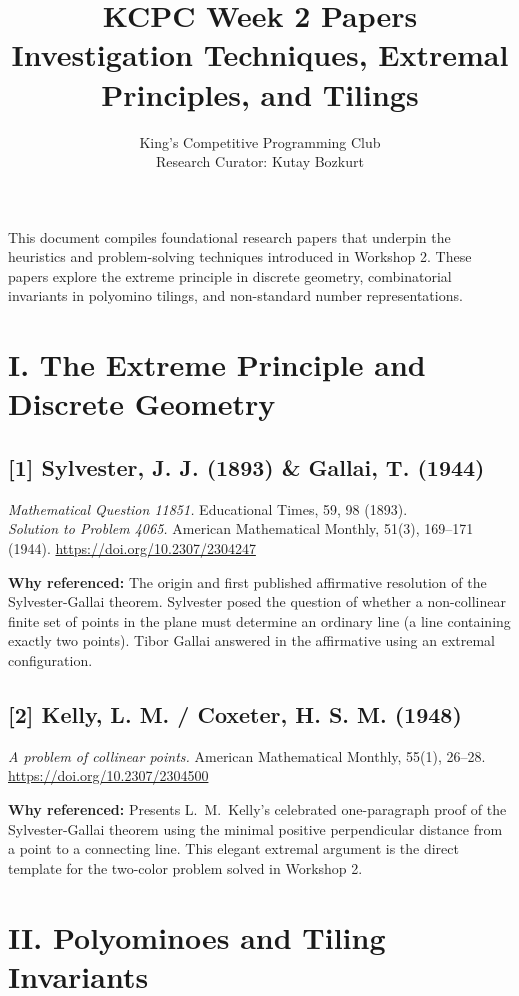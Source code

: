 \documentclass[11pt]{article}
\title{KCPC Week 2 Papers\\Investigation Techniques, Extremal Principles, and Tilings}
\author{King's Competitive Programming Club \\ \small Research Curator: Kutay Bozkurt}
\date{}
\begin{document}
\maketitle
\thispagestyle{fancy}

\noindent
This document compiles foundational research papers that underpin the heuristics and problem-solving techniques introduced in Workshop 2. These papers explore the extreme principle in discrete geometry, combinatorial invariants in polyomino tilings, and non-standard number representations.

\section*{I. The Extreme Principle and Discrete Geometry}

\subsection*{[1] Sylvester, J. J. (1893) \& Gallai, T. (1944)}
\textit{Mathematical Question 11851.} Educational Times, 59, 98 (1893). \\
\textit{Solution to Problem 4065.} American Mathematical Monthly, 51(3), 169--171 (1944).
\url{https://doi.org/10.2307/2304247}

\textbf{Why referenced:}
The origin and first published affirmative resolution of the Sylvester-Gallai theorem. Sylvester posed the question of whether a non-collinear finite set of points in the plane must determine an ordinary line (a line containing exactly two points). Tibor Gallai answered in the affirmative using an extremal configuration.

\vspace{1em}

\subsection*{[2] Kelly, L. M. / Coxeter, H. S. M. (1948)}
\textit{A problem of collinear points.}
American Mathematical Monthly, 55(1), 26--28.
\url{https://doi.org/10.2307/2304500}

\textbf{Why referenced:}
Presents L.~M.~Kelly's celebrated one-paragraph proof of the Sylvester-Gallai theorem using the minimal positive perpendicular distance from a point to a connecting line. This elegant extremal argument is the direct template for the two-color problem solved in Workshop 2.

\section*{II. Polyominoes and Tiling Invariants}
\end{document}
